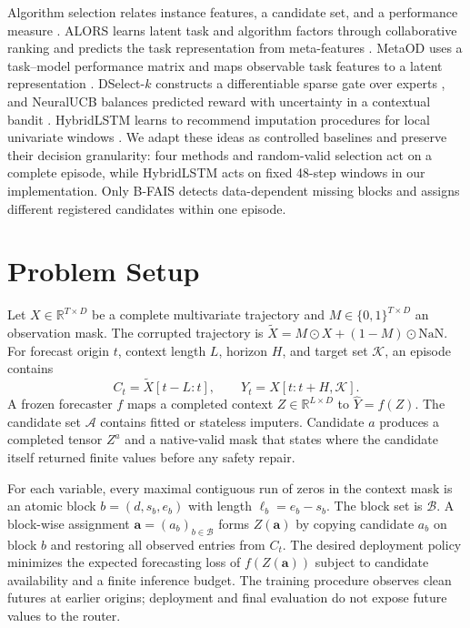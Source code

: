 \documentclass{article}
\newcommand{\bfais}{\textsc{B-FAIS}\xspace}
\begin{document}
Algorithm selection relates instance features, a candidate set, and a performance measure \citep{rice1976algorithm}. ALORS learns latent task and algorithm factors through collaborative ranking and predicts the task representation from meta-features \citep{misir2017alors}. MetaOD uses a task--model performance matrix and maps observable task features to a latent representation \citep{zhao2021automatic}. DSelect-$k$ constructs a differentiable sparse gate over experts \citep{hazimeh2021dselect}, and NeuralUCB balances predicted reward with uncertainty in a contextual bandit \citep{zhou2020neuralucb}. HybridLSTM learns to recommend imputation procedures for local univariate windows \citep{almeida2025hybridlstm}. We adapt these ideas as controlled baselines and preserve their decision granularity: four methods and random-valid selection act on a complete episode, while HybridLSTM acts on fixed 48-step windows in our implementation. Only \bfais detects data-dependent missing blocks and assigns different registered candidates within one episode.

\section{Problem Setup}
\label{sec:problem}

Let $X\in\mathbb{R}^{T\times D}$ be a complete multivariate trajectory and $M\in\{0,1\}^{T\times D}$ an observation mask. The corrupted trajectory is $\widetilde X=M\odot X+(1-M)\odot\mathrm{NaN}$. For forecast origin $t$, context length $L$, horizon $H$, and target set $\mathcal K$, an episode contains
\begin{equation}
 C_t=\widetilde X[t-L:t],\qquad
 Y_t=X[t:t+H,\mathcal K].
\end{equation}
A frozen forecaster $f$ maps a completed context $Z\in\mathbb{R}^{L\times D}$ to $\widehat Y=f(Z)$. The candidate set $\mathcal A$ contains fitted or stateless imputers. Candidate $a$ produces a completed tensor $Z^a$ and a native-valid mask that states where the candidate itself returned finite values before any safety repair.

For each variable, every maximal contiguous run of zeros in the context mask is an atomic block $b=(d,s_b,e_b)$ with length $\ell_b=e_b-s_b$. The block set is $\mathcal B$. A block-wise assignment $\mathbf a=(a_b)_{b\in\mathcal B}$ forms $Z(\mathbf a)$ by copying candidate $a_b$ on block $b$ and restoring all observed entries from $C_t$. The desired deployment policy minimizes the expected forecasting loss of $f(Z(\mathbf a))$ subject to candidate availability and a finite inference budget. The training procedure observes clean futures at earlier origins; deployment and final evaluation do not expose future values to the router.
\end{document}
